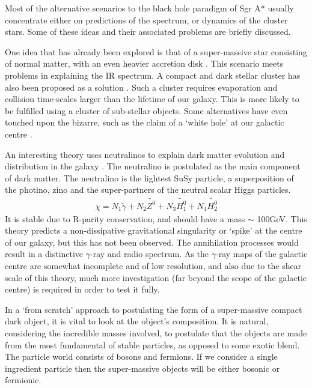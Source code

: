 Most of the alternative scenarios to the black hole paradigm of Sgr A* usually concentrate either on
predictions of the spectrum, or dynamics of the cluster stars. Some of these ideas and their associated problems are briefly discussed.

One idea that has already been explored is that of a super-massive star consisting of normal matter, with an even heavier accretion disk
\cite{ref_kundt}. This scenario meets problems in explaining the IR spectrum. A compact and dark stellar
cluster has also been proposed as a solution \cite{ref_maoz}. Such a cluster requires evaporation and collision time-scales larger
than the lifetime of our galaxy. This is more likely to be fulfilled using a cluster of sub-stellar objects.
Some alternatives have even touched upon the bizarre, such as the claim of a `white hole' at our galactic centre \cite{ref_whitehole}.

An interesting theory uses neutralinos to explain dark matter evolution and distribution in the galaxy \cite{ref_neutralino}.
The neutralino is postulated as the main component of dark matter. The neutralino is the lightest
SuSy particle, a superposition of the photino, zino and the super-partners of the neutral scalar Higgs particles.
\begin{eqnarray*}
	\chi = N_1\widetilde{\gamma} + N_2\widetilde{Z^0} + N_3\widetilde{H^0_1} + N_4\widetilde{H^0_2}
\end{eqnarray*}
It is stable due to R-parity conservation, and should have a mass $\sim$ 100GeV.
This theory predicts a non-dissipative gravitational singularity or `spike' at the centre of our galaxy, but this has not been observed. The
annihilation processes would result in a distinctive $\gamma$-ray and radio spectrum. As the $\gamma$-ray maps of the galactic centre
are somewhat incomplete and of low resolution, and also due to the shear scale of this theory, much more investigation (far beyond the
scope of the galactic centre) is required in order to test it fully.

In a `from scratch' approach to postulating the form of a super-massive compact dark object, it is vital to look at the object's
composition. It is natural, considering the incredible masses involved, to postulate that the objects are made from the most
fundamental of stable particles, as opposed to some exotic blend. The particle world consists of bosons and fermions.
If we consider a single ingredient particle then the super-massive objects will be either bosonic or fermionic.

